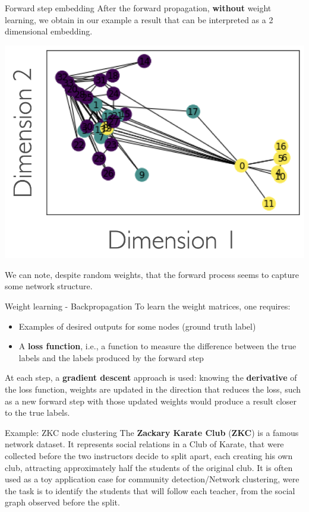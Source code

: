 \documentclass[a4paper,11pt]{book}
\begin{document}
\begin{textbox}{Forward step embedding}
After the forward propagation, \textbf{without} weight learning, we obtain in our example a result that can be interpreted as a 2 dimensional embedding. 

\centering
\includegraphics[width=0.7\linewidth]{pics/karateEmbedd.png}

We can note, despite random weights, that the forward process seems to capture some network structure.
\end{textbox}


\begin{textbox}{Weight learning - Backpropagation}
To learn the weight matrices, one requires: 
\begin{itemize}
    \item Examples of desired outputs for some nodes (ground truth label)
    \item A \textbf{loss function}, i.e., a function to measure the difference between the true labels and the labels produced by the forward step
\end{itemize}
At each step, a \textbf{gradient descent} approach is used: knowing the \textbf{derivative} of the loss function, weights are updated in the direction that reduces the loss, such as a new forward step with those updated weights would produce a result closer to the true labels. 
\end{textbox}



\begin{textbox}{Example: ZKC node clustering}
The \textbf{Zackary Karate Club} (\textbf{ZKC}) is a famous network dataset. It represents social relations in a Club of Karate, that were collected before the two instructors decide to split apart, each creating his own club, attracting approximately half  the students of the original club. It is often used as a toy application case for community detection/Network clustering, were the task is to identify the students that will follow each teacher, from the social graph observed before the split.
\end{textbox}
\end{document}
